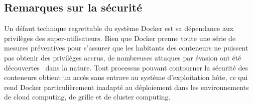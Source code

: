 \subsection{Remarques sur la sécurité}

Un défaut technique regrettable du système Docker est sa dépendance aux privilèges des super-utilisateurs. Bien que Docker prenne toute une série de mesures préventives pour s'assurer que les habitants des conteneurs ne puissent pas obtenir des privilèges accrus, de nombreuses attaques par évasion ont été découvertes~\citep{martin2018docker} dans la nature. Tout processus pouvant contourner la sécurité des conteneurs obtient un accès sans entrave au système d'exploitation hôte, ce qui rend Docker particulièrement inadapté au déploiement dans les environnements de cloud computing, de grille et de cluster computing.

